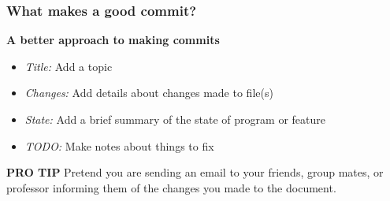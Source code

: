 \documentclass{beamer}
\begin{document}
\begin{frame} 
	\frametitle{\textbf{What makes a good commit?}}
	
	\textbf{A better approach to making commits} 
	\vspace{0.5cm}
	
	\begin{itemize}
		\item \textit{Title:} Add a topic
		\vspace{0.5cm}
		\item \textit{Changes:} Add details about changes made to file(s)
		\vspace{0.5cm}
		\item \textit{State:} Add a brief summary of the state of program or feature
		\vspace{0.5cm}
		\item \textit{TODO:} Make notes about things to fix
	\end{itemize}	

	\begin{block}{\textbf{PRO TIP}}
		Pretend you are sending an email to your friends, group mates, or professor
		informing them of the changes you made to the document.
	\end{block}

\end{frame} 
\end{document}
